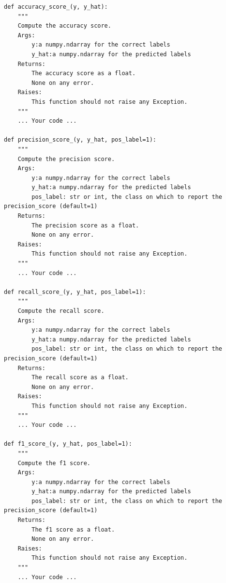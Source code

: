 \documentclass{42-en}
\begin{document}
\begin{verbatim}
def accuracy_score_(y, y_hat):
    """
    Compute the accuracy score.
    Args:
        y:a numpy.ndarray for the correct labels
        y_hat:a numpy.ndarray for the predicted labels
    Returns: 
        The accuracy score as a float.
        None on any error.
    Raises:
        This function should not raise any Exception.
    """
    ... Your code ...

def precision_score_(y, y_hat, pos_label=1):
    """
    Compute the precision score.
    Args:
        y:a numpy.ndarray for the correct labels
        y_hat:a numpy.ndarray for the predicted labels
        pos_label: str or int, the class on which to report the precision_score (default=1)
    Returns: 
        The precision score as a float.
        None on any error.
    Raises:
        This function should not raise any Exception.
    """
    ... Your code ...

def recall_score_(y, y_hat, pos_label=1):
    """
    Compute the recall score.
    Args:
        y:a numpy.ndarray for the correct labels
        y_hat:a numpy.ndarray for the predicted labels
        pos_label: str or int, the class on which to report the precision_score (default=1)
    Returns: 
        The recall score as a float.
        None on any error.
    Raises:
        This function should not raise any Exception.
    """
    ... Your code ...

def f1_score_(y, y_hat, pos_label=1):
    """
    Compute the f1 score.
    Args:
        y:a numpy.ndarray for the correct labels
        y_hat:a numpy.ndarray for the predicted labels
        pos_label: str or int, the class on which to report the precision_score (default=1)
    Returns: 
        The f1 score as a float.
        None on any error.
    Raises:
        This function should not raise any Exception.
    """
    ... Your code ...
\end{verbatim}

\end{document}
